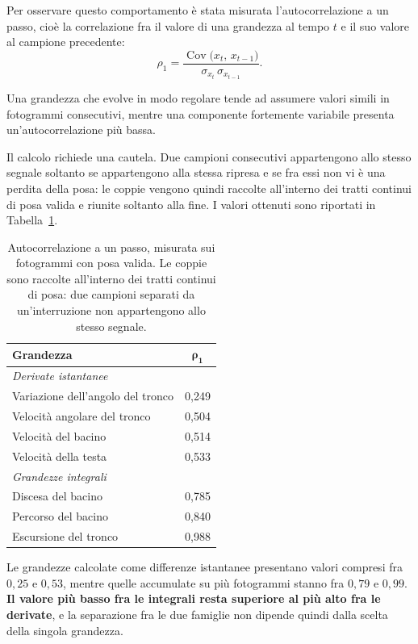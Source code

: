 Per osservare questo comportamento è stata misurata l'autocorrelazione a un passo, cioè la correlazione fra il valore di una grandezza al tempo \(t\) e il suo valore al campione precedente:
\[
\rho_1 = \frac{\operatorname{Cov}\big(x_t,\,x_{t-1}\big)}
              {\sigma_{x_t}\,\sigma_{x_{t-1}}}.
\]

Una grandezza che evolve in modo regolare tende ad assumere valori simili in fotogrammi consecutivi, mentre una componente fortemente variabile presenta un'autocorrelazione più bassa.

Il calcolo richiede una cautela. Due campioni consecutivi appartengono allo stesso segnale soltanto se appartengono alla stessa ripresa e se fra essi non vi è una perdita della posa: le coppie vengono quindi raccolte all'interno dei tratti continui di posa valida e riunite soltanto alla fine. I valori ottenuti sono riportati in Tabella~\ref{tab:autocorrelazione}.

\begin{table}[ht]
\centering
\caption{Autocorrelazione a un passo, misurata sui fotogrammi con posa valida.
Le coppie sono raccolte all'interno dei tratti continui di posa: due campioni
separati da un'interruzione non appartengono allo stesso segnale.}
\label{tab:autocorrelazione}
\begin{tabular}{lc}
\toprule
\textbf{Grandezza} & $\boldsymbol{\rho_1}$ \\
\midrule
\multicolumn{2}{l}{\emph{Derivate istantanee}} \\
\quad Variazione dell'angolo del tronco & 0,249 \\
\quad Velocità angolare del tronco      & 0,504 \\
\quad Velocità del bacino               & 0,514 \\
\quad Velocità della testa              & 0,533 \\
\midrule
\multicolumn{2}{l}{\emph{Grandezze integrali}} \\
\quad Discesa del bacino                & 0,785 \\
\quad Percorso del bacino               & 0,840 \\
\quad Escursione del tronco             & 0,988 \\
\bottomrule
\end{tabular}
\end{table}

Le grandezze calcolate come differenze istantanee presentano valori compresi fra \(0{,}25\) e \(0{,}53\), mentre quelle accumulate su più fotogrammi stanno fra \(0{,}79\) e \(0{,}99\). \textbf{Il valore più basso fra le integrali resta superiore al più alto fra le derivate}, e la separazione fra le due famiglie non dipende quindi dalla scelta della singola grandezza.

